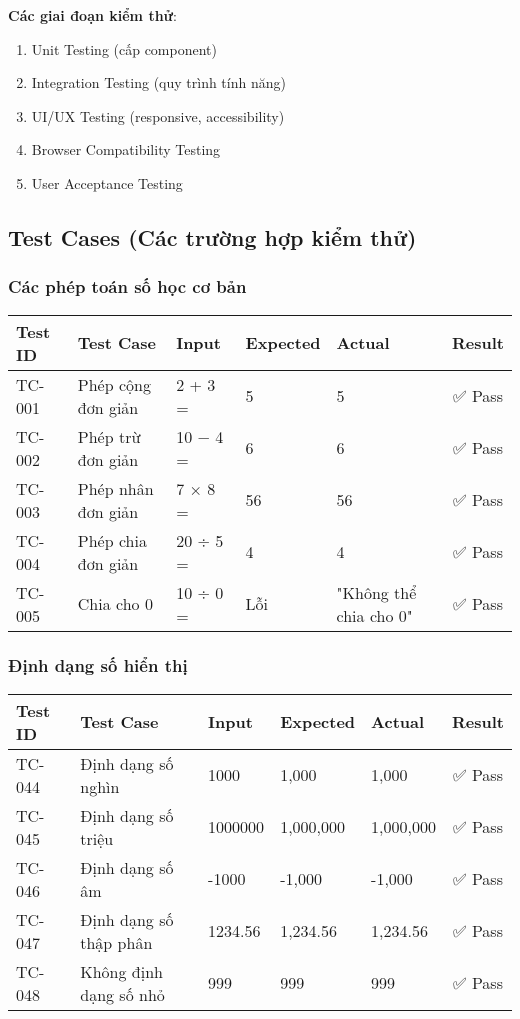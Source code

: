 \textbf{Các giai đoạn kiểm thử}:
\begin{enumerate}
    \item Unit Testing (cấp component)
    \item Integration Testing (quy trình tính năng)
    \item UI/UX Testing (responsive, accessibility)
    \item Browser Compatibility Testing
    \item User Acceptance Testing
\end{enumerate}

\subsection{Test Cases (Các trường hợp kiểm thử)}

\subsubsection{Các phép toán số học cơ bản}

\begin{longtable}{|l|l|l|l|l|c|}
\hline
\textbf{Test ID} & \textbf{Test Case} & \textbf{Input} & \textbf{Expected} & \textbf{Actual} & \textbf{Result} \\
\hline
\endhead
TC-001 & Phép cộng đơn giản & 2 + 3 = & 5 & 5 & ✅ Pass \\
TC-002 & Phép trừ đơn giản & 10 − 4 = & 6 & 6 & ✅ Pass \\
TC-003 & Phép nhân đơn giản & 7 × 8 = & 56 & 56 & ✅ Pass \\
TC-004 & Phép chia đơn giản & 20 ÷ 5 = & 4 & 4 & ✅ Pass \\
TC-005 & Chia cho 0 & 10 ÷ 0 = & Lỗi & "Không thể chia cho 0" & ✅ Pass \\
\hline
\end{longtable}

\subsubsection{Định dạng số hiển thị}

\begin{longtable}{|l|l|l|l|l|c|}
\hline
\textbf{Test ID} & \textbf{Test Case} & \textbf{Input} & \textbf{Expected} & \textbf{Actual} & \textbf{Result} \\
\hline
\endhead
TC-044 & Định dạng số nghìn & 1000 & 1,000 & 1,000 & ✅ Pass \\
TC-045 & Định dạng số triệu & 1000000 & 1,000,000 & 1,000,000 & ✅ Pass \\
TC-046 & Định dạng số âm & -1000 & -1,000 & -1,000 & ✅ Pass \\
TC-047 & Định dạng số thập phân & 1234.56 & 1,234.56 & 1,234.56 & ✅ Pass \\
TC-048 & Không định dạng số nhỏ & 999 & 999 & 999 & ✅ Pass \\
\hline
\end{longtable}


